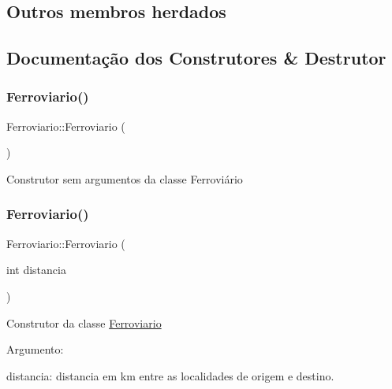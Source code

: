 \subsection*{Outros membros herdados}


\subsection{Documentação dos Construtores \& Destrutor}
\mbox{\label{classFerroviario_ad9ab87f65b1e904a3fec909076f0a993}} 
\subsubsection{\texorpdfstring{Ferroviario()}{Ferroviario()}\hspace{0.1cm}{\footnotesize\ttfamily [1/2]}}
{\footnotesize\ttfamily Ferroviario\+::\+Ferroviario (\begin{DoxyParamCaption}{ }\end{DoxyParamCaption})}

Construtor sem argumentos da classe Ferroviário\mbox{\label{classFerroviario_a497cd242a790babb459821c59ff3678c}} 
\subsubsection{\texorpdfstring{Ferroviario()}{Ferroviario()}\hspace{0.1cm}{\footnotesize\ttfamily [2/2]}}
{\footnotesize\ttfamily Ferroviario\+::\+Ferroviario (\begin{DoxyParamCaption}\item[{int}]{distancia }\end{DoxyParamCaption})}

Construtor da classe \hyperlink{classFerroviario}{Ferroviario}

Argumento\+:
\begin{DoxyItemize}
\item distancia\+: distancia em km entre as localidades de origem e destino.
\end{DoxyItemize}\mbox{\label{classFerroviario_a14356b699e7cd2651654ef06029d2f0d}} 
